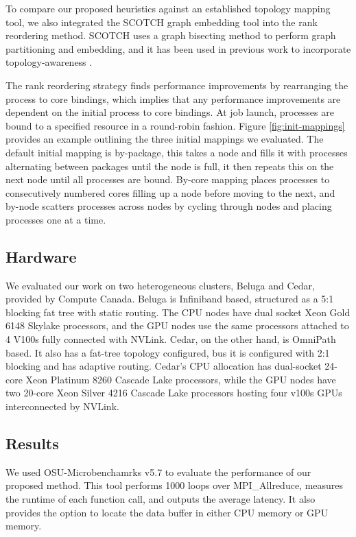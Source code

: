 To compare our proposed heuristics against an established topology mapping tool, we also integrated the SCOTCH graph embedding tool \cite{Pellegrini2012SCOTCH} into the rank reordering method.
SCOTCH uses a graph bisecting method to perform graph partitioning and embedding, and it has been used in previous work to incorporate topology-awareness \cite{Mirsadeghi2016TopoAwareCollRR}.


The rank reordering strategy finds performance improvements by rearranging the process to core bindings, which implies that any performance improvements are dependent on the initial process to core bindings.
At job launch, processes are bound to a specified resource in a round-robin fashion.
Figure \ref{fig:init-mappings} provides an example outlining the three initial mappings we evaluated.
The default initial mapping is by-package, this takes a node and fills it with processes alternating between packages until the node is full, it then repeats this on the next node until all processes are bound.
By-core mapping places processes to consecutively numbered cores filling up a node before moving to the next, and by-node scatters processes across nodes by cycling through nodes and placing processes one at a time.

\subsection{Hardware}\label{sec:topo-eval-hardware}
We evaluated our work on two heterogeneous clusters, Beluga and Cedar, provided by Compute Canada. 
Beluga is Infiniband based, structured as a 5:1 blocking fat tree with static routing.  
The CPU nodes have dual socket Xeon Gold 6148 Skylake processors, and the GPU nodes use the same processors attached to 4 V100s fully connected with NVLink.
Cedar, on the other hand, is OmniPath based.
It also has a fat-tree topology configured, bus it is configured with 2:1 blocking and has adaptive routing.
Cedar's CPU allocation has dual-socket 24-core Xeon Platinum 8260 Cascade Lake processors, while the GPU nodes have two 20-core Xeon Silver 4216 Cascade Lake processors hosting four v100s GPUs interconnected by NVLink.

\subsection{Results}
We used OSU-Microbenchamrks v5.7 \cite{Bureddy2012OMB} to evaluate the performance of our proposed method. 
This tool performs 1000 loops over MPI\_Allreduce, measures the runtime of each function call, and outputs the average latency. 
It also provides the option to locate the data buffer in either CPU memory or GPU memory.


